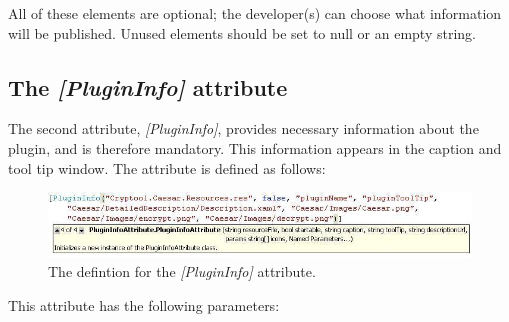 All of these elements are optional; the developer(s) can choose what information will be published. Unused elements should be set to null or an empty string.
\clearpage


\subsection{The \textit{[PluginInfo]} attribute}
\label{sec:ThePluginInfoAttribute}

The second attribute, \textit{[PluginInfo]}, provides necessary information about the plugin, and is therefore mandatory. This information appears in the caption and tool tip window. The attribute is defined as follows:

\begin{figure}[h]
	\centering
		\includegraphics[width=1.00\textwidth]{figures/attribute_plugininfo_new.jpg}
	\caption{The defintion for the \textit{[PluginInfo]} attribute.}
	\label{fig:attribute_plugininfo}
\end{figure}

\noindent This attribute has the following parameters:

